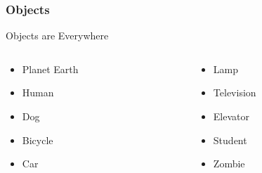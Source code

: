 \documentclass[10pt, compress]{beamer}
\begin{document}
\begin{frame}[fragile]
	\frametitle{Objects}
	\begin{block}{Objects are Everywhere}
		\begin{columns}
			\begin{column}{0.5\textwidth}
				\begin{itemize}
					\item[] Planet Earth
					\item[] Human
					\item[] Dog
					\item[] Bicycle
					\item[] Car
				\end{itemize}
			\end{column}
			\begin{column}{0.5\textwidth}
				\begin{itemize}
					\item[] Lamp
					\item[] Television
					\item[] Elevator
					\item[] Student
					\item[] Zombie
				\end{itemize}
			\end{column}
		\end{columns}
	\end{block}
\end{frame}
\end{document}
